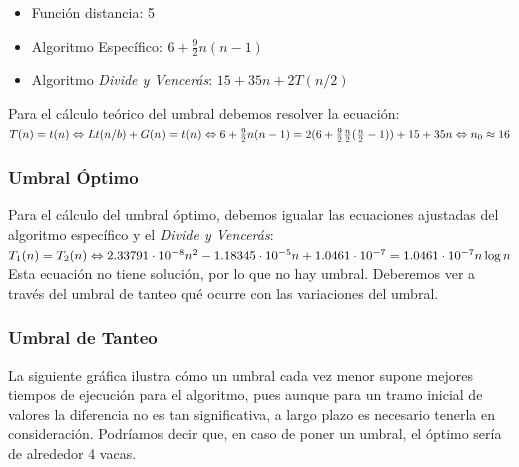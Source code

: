 \documentclass[a4paper,12pt,twoside]{article} %
\begin{document}
\begin{itemize}
	\item Función distancia: 5
	\item Algoritmo Específico: $6 + \frac{9}{2} n(n-1)$
	\item Algoritmo \textit{Divide y Vencerás}: $15+35n +2T(n/2)$
\end{itemize}

Para el cálculo teórico del umbral debemos resolver la ecuación:\\

$T(n)=t(n) \Leftrightarrow  Lt(n/b) + G(n) = t(n) \Leftrightarrow \\
6 + \frac{9}{2} n(n-1) = 2(6 + \frac{9}{2} \frac{n}{2}(\frac{n}{2}-1)) +15 +35n \Leftrightarrow n_0 \approx 16
$

\subsubsection{Umbral Óptimo}

Para el cálculo del umbral óptimo, debemos igualar las ecuaciones ajustadas del algoritmo específico y el \textit{Divide y Vencerás}:\\

$T_1(n) = T_2(n) \Leftrightarrow \\
2.33791 \cdot{10^{-8}} n^2 -1.18345 \cdot{10^{-5}} n + 1.0461  \cdot{10^{-7}} = 1.0461 \cdot{10^{-7}} n \log{n}$\\

Esta ecuación no tiene solución, por lo que no hay umbral. Deberemos ver a través del umbral de tanteo qué ocurre con las variaciones del umbral.\\

\newpage

\subsubsection{Umbral de Tanteo}

La siguiente gráfica ilustra cómo un umbral cada vez menor supone mejores tiempos de ejecución para el algoritmo, pues aunque para un tramo inicial de valores la diferencia no es tan significativa, a largo plazo es necesario tenerla en consideración. Podríamos decir que, en caso de poner un umbral, el óptimo sería de alrededor 4 vacas.
\end{document}

